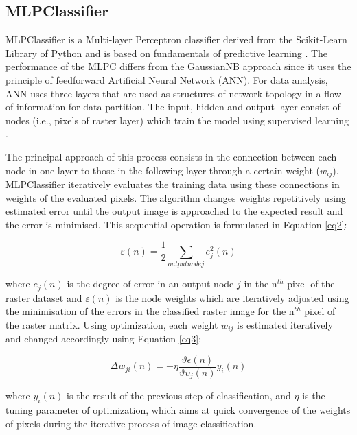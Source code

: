\documentclass[final,5p,times,twocolumn]{elsarticle}
\numberwithin{table}{section}
\begin{document}
\subsection{MLPClassifier}

MLPClassifier is a Multi-layer Perceptron classifier derived from the Scikit-Learn Library of Python and is based on fundamentals of predictive learning \cite{Rosenblatt}. The performance of the MLPC differs from the GaussianNB approach since it uses the principle of feedforward Artificial Neural Network (ANN). For data analysis, ANN uses three layers that are used as structures of network topology in a flow of information for data partition. The input, hidden and output layer consist of nodes (i.e., pixels of raster layer) which train the model using supervised learning \cite{ALDOUSARI2023381,9034557}. 

The principal approach of this process consists in the connection between each node in one layer to those in the following layer through a certain weight ($w_{ij}$). MLPClassifier iteratively evaluates the training data using these connections in weights of the evaluated pixels. The algorithm changes weights repetitively using estimated error until the output image is approached to the expected result and the error is minimised. This sequential operation is formulated in Equation \ref{eq2}: 

\begin{equation}
\varepsilon(n)=\frac{1}{2} \sum_{output node j}{e_{j}^2(n)}
\label{eq2}
\end{equation}

where $e_j(n)$ is the degree of error in an output node $j$ in the n$^{th}$  pixel of the raster dataset and $\varepsilon(n)$ is the node weights which are iteratively adjusted using the minimisation of the errors in the classified raster image for the n$^{th}$ pixel of the raster matrix. Using optimization, each weight $w_{ij}$ is estimated iteratively and changed accordingly using Equation \ref{eq3}: 

\begin{equation}
\Delta w_{ji}(n)=-\eta\frac{\vartheta\epsilon(n)}{\vartheta\upsilon_{j}(n)}y_{i}(n)
\label{eq3}
\end{equation}

where $y_{i}(n)$ is the result of the previous step of classification, and $\eta$ is the tuning parameter of optimization, which aims at quick convergence of the weights of pixels during the iterative process of image classification.
\end{document}
